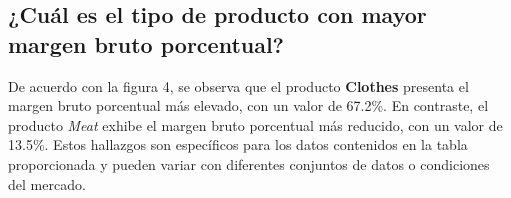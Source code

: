 \documentclass[10pt]{article}
\begin{document}
\begin{paracol}{2}
\section{¿Cuál es el tipo de producto con mayor margen bruto porcentual?}
\switchcolumn[0]\noindent
De acuerdo con la figura 4, se observa que el producto \textbf{Clothes} presenta el margen bruto porcentual más elevado, con un valor de 67.2\%. En contraste, el producto \textit{Meat} exhibe el margen bruto porcentual más reducido, con un valor de 13.5\%. Estos hallazgos son específicos para los datos contenidos en la tabla proporcionada y pueden variar con diferentes conjuntos de datos o condiciones del mercado.




\end{paracol}
\end{document}
